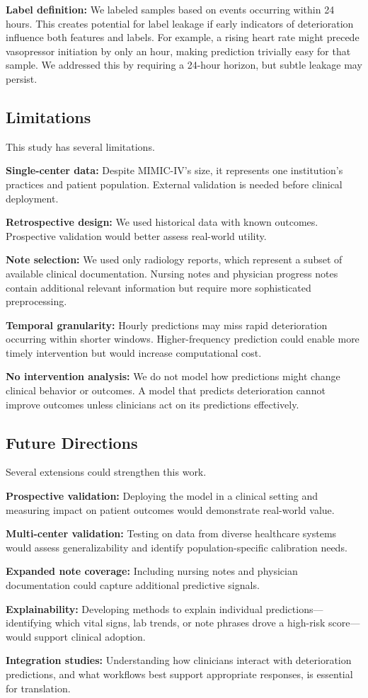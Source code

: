 \textbf{Label definition:} We labeled samples based on events occurring within 24 hours. This creates potential for label leakage if early indicators of deterioration influence both features and labels. For example, a rising heart rate might precede vasopressor initiation by only an hour, making prediction trivially easy for that sample. We addressed this by requiring a 24-hour horizon, but subtle leakage may persist.

\subsection{Limitations}

This study has several limitations.

\textbf{Single-center data:} Despite MIMIC-IV's size, it represents one institution's practices and patient population. External validation is needed before clinical deployment.

\textbf{Retrospective design:} We used historical data with known outcomes. Prospective validation would better assess real-world utility.

\textbf{Note selection:} We used only radiology reports, which represent a subset of available clinical documentation. Nursing notes and physician progress notes contain additional relevant information but require more sophisticated preprocessing.

\textbf{Temporal granularity:} Hourly predictions may miss rapid deterioration occurring within shorter windows. Higher-frequency prediction could enable more timely intervention but would increase computational cost.

\textbf{No intervention analysis:} We do not model how predictions might change clinical behavior or outcomes. A model that predicts deterioration cannot improve outcomes unless clinicians act on its predictions effectively.

\subsection{Future Directions}

Several extensions could strengthen this work.

\textbf{Prospective validation:} Deploying the model in a clinical setting and measuring impact on patient outcomes would demonstrate real-world value.

\textbf{Multi-center validation:} Testing on data from diverse healthcare systems would assess generalizability and identify population-specific calibration needs.

\textbf{Expanded note coverage:} Including nursing notes and physician documentation could capture additional predictive signals.

\textbf{Explainability:} Developing methods to explain individual predictions---identifying which vital signs, lab trends, or note phrases drove a high-risk score---would support clinical adoption.

\textbf{Integration studies:} Understanding how clinicians interact with deterioration predictions, and what workflows best support appropriate responses, is essential for translation.
